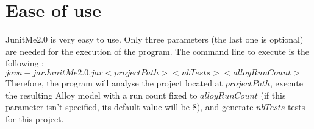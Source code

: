 \section{Ease of use}
\label{sec:Ease}
	JunitMe2.0 is very easy to use. Only three parameters (the last one is optional) are needed for the execution of the program. The command line to execute is the following :\\
$java -jar JunitMe2.0.jar <projectPath> <nbTests> <alloyRunCount>$\\
Therefore, the program will analyse the project located at $projectPath$, execute the resulting Alloy model with a run count fixed to $alloyRunCount$ (if this parameter isn't specified, its default value will be 8), and generate $nbTests$ tests for this project.